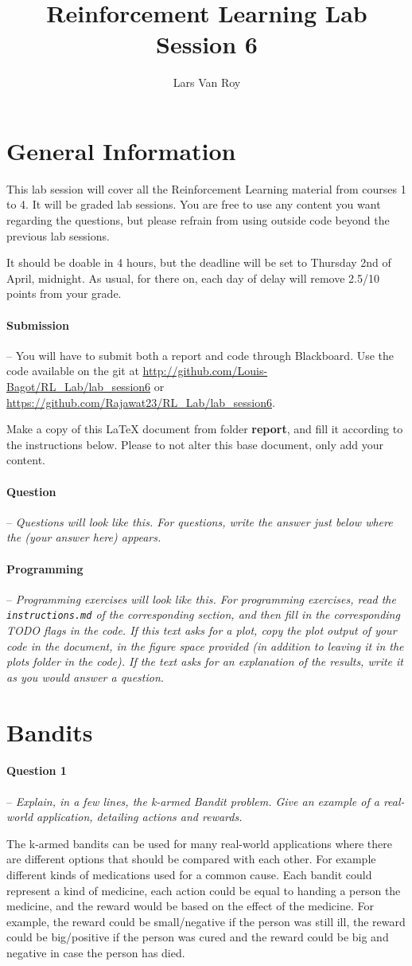 \documentclass[a4paper]{article}
\title{Reinforcement Learning Lab Session 6}
\author{Lars Van Roy}
\newcommand{\question}[2]{
\paragraph{Question #1} -- \textit{#2}

}
\newcommand{\programming}[1]{
\paragraph{Programming} -- \textit{#1}

}
\begin{document}
\maketitle
\section*{General Information}
This lab session will cover all the Reinforcement Learning material from courses 1 to 4. It will be graded lab sessions. You are free to use any content you want regarding the questions, but please refrain from using outside code beyond the previous lab sessions.

It should be doable in 4 hours, but the deadline will be set to Thursday 2nd of April, midnight. As usual, for there on, each day of delay will remove 2.5/10 points from your grade.

\paragraph{Submission} --
You will have to submit both a report and code through Blackboard. Use the code available on the git at \url{http://github.com/Louis-Bagot/RL_Lab/lab_session6} or \url{https://github.com/Rajawat23/RL_Lab/lab_session6}.

Make a copy of this LaTeX document from folder \textbf{report}, and fill it according to the instructions below. Please to not alter this base document, only add your content.

\question{}{Questions will look like this. For questions, write the answer just below where the (your answer here) appears.}
\programming{Programming exercises will look like this. For programming exercises, read the \texttt{instructions.md} of the corresponding section, and then fill in the corresponding TODO flags in the code. If this text asks for a plot, copy the plot output of your code in the document, in the figure space provided (in addition to leaving it in the plots folder in the code). If the text asks for an explanation of the results, write it as you would answer a question.}

\tableofcontents
\newpage

\section{Bandits}
\question{1}{Explain, in a few lines, the k-armed Bandit problem. Give an example of a real-world application, detailing actions and rewards.}
The k-armed bandits can be used for many real-world applications where there are different options that should be compared with each other. For example different kinds of medications used for a common cause. Each bandit could represent a kind of medicine, each action could be equal to handing a person the medicine, and the reward would be based on the effect of the medicine. For example, the reward could be small/negative if the person was still ill, the reward could be big/positive if the person was cured and the reward could be big and negative in case the person has died.
\end{document}

